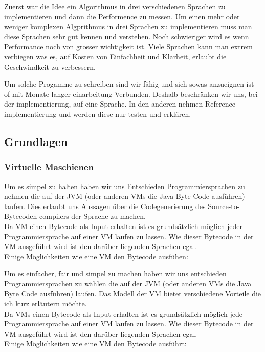 \documentclass{fancydocument}
\begin{document}
Zuerst war die Idee ein Algorithmus in drei verschiedenen Sprachen zu
implementieren und dann die Performence zu messen. Um einen mehr oder
weniger komplexen Algprithmus in drei Sprachen zu implementieren muss
man diese Sprachen sehr gut kennen und verstehen. Noch schwieriger
wird es wenn Performance noch von grosser wichtigkeit ist. Viele
Sprachen kann man extrem verbiegen was es, auf Kosten von
Einfachheit und Klarheit, erlaubt die Geschwindkeit zu verbessern.

Um solche Progamme zu schreiben sind wir f\"ahig und sich sowas
anzueignen ist of mit Monate langer einarbeitung Verbunden. Deshalb
beschr\"anken wir uns, bei der implementierung, auf eine Sprache. In
den anderen nehmen Reference implementierung und werden diese nur
testen und erkl\"aren.

\subsection{Grundlagen}

\subsubsection{Virtuelle Maschienen}

Um es simpel zu halten haben wir uns Entschieden
Programmiersprachen zu nehmen die auf der JVM (oder anderen VMs die
Java Byte Code ausf\"uhren) laufen. Dies erlaubt uns Aussagen \"uber die
Codegenerierung des Source-to-Bytecoden compilers der Sprache zu
machen.
\\
Da VM einen Bytecode als Input erhalten ist es grunds\"atzlich m\"oglich
jeder Programmiersprache auf einer VM laufen zu lassen. Wie dieser
Bytecode in der VM ausgef\"uhrt wird ist den dar\"uber liegenden Sprachen
egal.\\ 
Einige M\"oglichkeiten wie eine VM den Bytecode ausf\"uhen:

Um es einfacher, fair und simpel zu machen haben wir uns entschieden
Programmiersprachen zu wählen die auf der JVM (oder anderen VMs die
Java Byte Code ausführen) laufen. Das Modell der VM bietet
verschiedene Vorteile die ich kurz erläutern möchte.
\\
Da VMs einen Bytecode als Input erhalten ist es grundsätzlich möglich
jede Programmiersprache auf einer VM laufen zu lassen. Wie dieser
Bytecode in der VM ausgeführt wird ist den darüber liegenden Sprachen
egal.\\ 
Einige Möglichkeiten wie eine VM den Bytecode ausführt:
\end{document}
